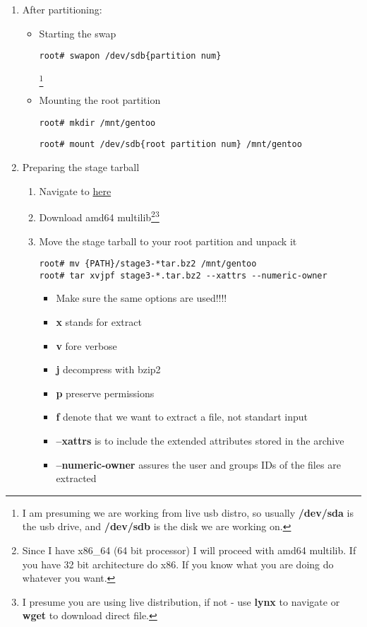 \documentclass[10pt,a4paper]{article}
\begin{document}
\begin{enumerate}
\begin{enumerate}[label*=\arabic*.]
			\item After partitioning:\begin{itemize}

				\item Starting the swap 
\begin{lstlisting}[style=BashInputRoot]
root# swapon /dev/sdb{partition num}
\end{lstlisting}\footnote{ I am presuming we are working from live usb distro, so usually \textbf{/dev/sda} is the usb drive, and \textbf{/dev/sdb} is the disk we are working on.}
				
				\item Mounting the root partition 
\begin{lstlisting}[style=BashInputRoot]
root# mkdir /mnt/gentoo
\end{lstlisting}
\begin{lstlisting}[style=BashInputRoot]
root# mount /dev/sdb{root partition num} /mnt/gentoo
\end{lstlisting}

			\end{itemize}
			
			\item Preparing the stage tarball \begin{enumerate}[label*=\arabic*.]
				\item Navigate to \href{https://www.gentoo.org/downloads/#other-arches}{here}
				
				\item Download amd64 multilib\footnote{Since I have x86\_64 (64 bit processor) I will proceed with amd64 multilib. If you have 32 bit architecture do x86. If you know what you are doing do whatever you want.}\footnote{I presume you are using live distribution, if not - use \textbf{lynx} to navigate or \textbf{wget} to download direct file.}
				
				\item Move the stage tarball to your root partition and unpack it
				\begin{lstlisting}[style=BashInputRoot]
root# mv {PATH}/stage3-*tar.bz2 /mnt/gentoo
root# tar xvjpf stage3-*.tar.bz2 --xattrs --numeric-owner
				\end{lstlisting} \begin{itemize}
					\item Make sure the same options are used!!!!
					\item \textbf{x} stands for extract
					\item \textbf{v} fore verbose
					\item \textbf{j} decompress with bzip2
					\item \textbf{p} preserve permissions
					\item \textbf{f} denote that we want to extract a file, not standart input
					\item \textbf{--xattrs} is to include the extended attributes stored in the archive
					\item \textbf{--numeric-owner} assures the user and groups IDs of the files are extracted
				\end{itemize}


\end{enumerate}
\end{enumerate}
\end{enumerate}
\end{document}
